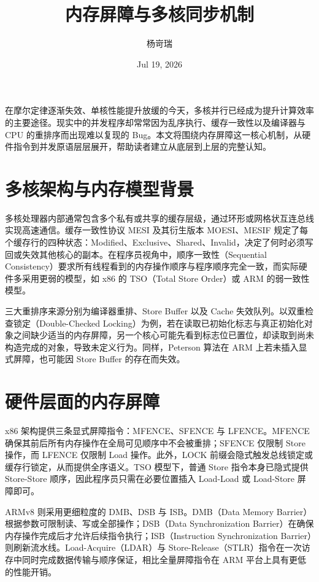 \title{内存屏障与多核同步机制}
\author{杨岢瑞}
\date{Jul 19, 2026}
\maketitle
在摩尔定律逐渐失效、单核性能提升放缓的今天，多核并行已经成为提升计算效率的主要途径。现实中的并发程序却常常因为乱序执行、缓存一致性以及编译器与 CPU 的重排序而出现难以复现的 Bug。本文将围绕内存屏障这一核心机制，从硬件指令到并发原语层层展开，帮助读者建立从底层到上层的完整认知。\par
\chapter{多核架构与内存模型背景}
多核处理器内部通常包含多个私有或共享的缓存层级，通过环形或网格状互连总线实现高速通信。缓存一致性协议 MESI 及其衍生版本 MOESI、MESIF 规定了每个缓存行的四种状态：Modified、Exclusive、Shared、Invalid，决定了何时必须写回或失效其他核心的副本。在程序员视角中，顺序一致性（Sequential Consistency）要求所有线程看到的内存操作顺序与程序顺序完全一致，而实际硬件多采用更弱的模型，如 x86 的 TSO（Total Store Order）或 ARM 的弱一致性模型。\par
三大重排序来源分别为编译器重排、Store Buffer 以及 Cache 失效队列。以双重检查锁定（Double-Checked Locking）为例，若在读取已初始化标志与真正初始化对象之间缺少适当的内存屏障，另一个核心可能先看到标志位已置位，却读取到尚未构造完成的对象，导致未定义行为。同样，Peterson 算法在 ARM 上若未插入显式屏障，也可能因 Store Buffer 的存在而失效。\par
\chapter{硬件层面的内存屏障}
x86 架构提供三条显式屏障指令：MFENCE、SFENCE 与 LFENCE。MFENCE 确保其前后所有内存操作在全局可见顺序中不会被重排；SFENCE 仅限制 Store 操作，而 LFENCE 仅限制 Load 操作。此外，LOCK 前缀会隐式触发总线锁定或缓存行锁定，从而提供全序语义。TSO 模型下，普通 Store 指令本身已隐式提供 Store-Store 顺序，因此程序员只需在必要位置插入 Load-Load 或 Load-Store 屏障即可。\par
ARMv8 则采用更细粒度的 DMB、DSB 与 ISB。DMB（Data Memory Barrier）根据参数可限制读、写或全部操作；DSB（Data Synchronization Barrier）在确保内存操作完成后才允许后续指令执行；ISB（Instruction Synchronization Barrier）则刷新流水线。Load-Acquire（LDAR）与 Store-Release（STLR）指令在一次访存中同时完成数据传输与顺序保证，相比全量屏障指令在 ARM 平台上具有更低的性能开销。\par
